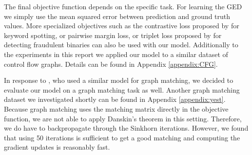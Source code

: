 The final objective function depends on the specific task. For learning the GED we simply use the mean squared error between prediction and ground truth values. More specialized objectives such as the contrastive loss proposed by \cite{riba2018} for keyword spotting, or pairwise margin loss, or triplet loss proposed by \cite{li2019} for detecting fraudulent binaries can also be used with our model. Additionally to the experiments in this report we applied our model to a similar dataset of control flow graphs. Details can be found in Appendix \ref{appendix:CFG}.

In response to \cite{fey2020_update}, who used a similar model for graph matching, we decided to evaluate our model on a graph matching task as well. Another graph matching dataset we investigated shortly can be found in Appendix \ref{appendix:yest}. Because graph matching uses the matching matrix directly in the objective function, we are not able to apply Danskin's theorem in this setting. Therefore, we do have to backpropagate through the Sinkhorn iterations. However, we found that using 50 iterations is sufficient to get a good matching and computing the gradient updates is reasonably fast.

